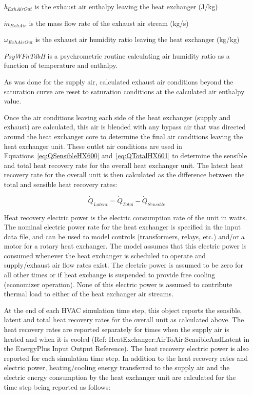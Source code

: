 \emph{h\(_{ExhAirOut}\)} is the exhaust air enthalpy leaving the heat exchanger (J/kg)

\({\dot{m}_{ExhAir}}\) is the mass flow rate of the exhaust air stream (kg/s)

\({\omega_{ExhAirOut}}\) is the exhaust air humidity ratio leaving the heat exchanger (kg/kg)

\emph{PsyWFnTdbH} is a psychrometric routine calculating air humidity ratio as a function of temperature and enthalpy.

As was done for the supply air, calculated exhaust air conditions beyond the saturation curve are reset to saturation conditions at the calculated air enthalpy value.

Once the air conditions leaving each side of the heat exchanger (supply and exhaust) are calculated, this air is blended with any bypass air that was directed around the heat exchanger core to determine the final air conditions leaving the heat exchanger unit. These outlet air conditions are used in Equations~\ref{eq:QSensibleHX600} and~\ref{eq:QTotalHX601} to determine the sensible and total heat recovery rate for the overall heat exchanger unit. The latent heat recovery rate for the overall unit is then calculated as the difference between the total and sensible heat recovery rates:

\begin{equation}
{\dot{Q}_{Latent}} = {\dot{Q}_{Total}} - {\dot{Q}_{Sensible}}
\end{equation}

Heat recovery electric power is the electric consumption rate of the unit in watts. The nominal electric power rate for the heat exchanger is specified in the input data file, and can be used to model controls (transformers, relays, etc.) and/or a motor for a rotary heat exchanger. The model assumes that this electric power is consumed whenever the heat exchanger is scheduled to operate and supply/exhaust air flow rates exist. The electric power is assumed to be zero for all other times or if heat exchange is suspended to provide free cooling (economizer operation). None of this electric power is assumed to contribute thermal load to either of the heat exchanger air streams.

At the end of each HVAC simulation time step, this object reports the sensible, latent and total heat recovery rates for the overall unit as calculated above. The heat recovery rates are reported separately for times when the supply air is heated and when it is cooled (Ref: HeatExchanger:AirToAir:SensibleAndLatent in the EnergyPlus Input Output Reference). The heat recovery electric power is also reported for each simulation time step. In addition to the heat recovery rates and electric power, heating/cooling energy transferred to the supply air and the electric energy consumption by the heat exchanger unit are calculated for the time step being reported as follows:

